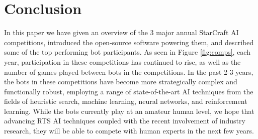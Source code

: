 \section{Conclusion}\label{secConclusion}

In this paper we have given an overview of the 3 major annual StarCraft AI competitions, introduced the open-source software powering them, and described some of the top performing bot participants. As seen in Figure \ref{fig:comps}, each year, participation in these competitions has continued to rise, as well as the number of games played between bots in the competitions. In the past 2-3 years, the bots in these competitions have become more strategically complex and functionally robust, employing a range of state-of-the-art AI techniques from the fields of heuristic search, machine learning, neural networks, and reinforcement learning. While the bots currently play at an amateur human level, we hope that advancing RTS AI techniques coupled with the recent involvement of industry research, they will be able to compete with human experts in the next few years.
